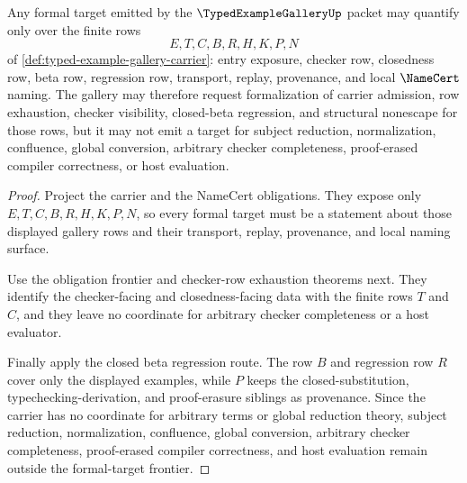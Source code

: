 \begin{theorem}
\label{thm:typed-example-gallery-formal-target-frontier}
Any formal target emitted by the $\TypedExampleGalleryUp$ packet may quantify only over the finite rows
$$
E,T,C,B,R,H,K,P,N
$$
of \autoref{def:typed-example-gallery-carrier}: entry exposure, checker row, closedness row, beta row, regression row, transport, replay, provenance, and local $\NameCert$ naming. The gallery may therefore request formalization of carrier admission, row exhaustion, checker visibility, closed-beta regression, and structural nonescape for those rows, but it may not emit a target for subject reduction, normalization, confluence, global conversion, arbitrary checker completeness, proof-erased compiler correctness, or host evaluation.
\end{theorem}
\begin{proof}
Project the carrier and the NameCert obligations. They expose only $E,T,C,B,R,H,K,P,N$, so every formal target must be a statement about those displayed gallery rows and their transport, replay, provenance, and local naming surface.

Use the obligation frontier and checker-row exhaustion theorems next. They identify the checker-facing and closedness-facing data with the finite rows $T$ and $C$, and they leave no coordinate for arbitrary checker completeness or a host evaluator.

Finally apply the closed beta regression route. The row $B$ and regression row $R$ cover only the displayed examples, while $P$ keeps the closed-substitution, typechecking-derivation, and proof-erasure siblings as provenance. Since the carrier has no coordinate for arbitrary terms or global reduction theory, subject reduction, normalization, confluence, global conversion, arbitrary checker completeness, proof-erased compiler correctness, and host evaluation remain outside the formal-target frontier.
\end{proof}

